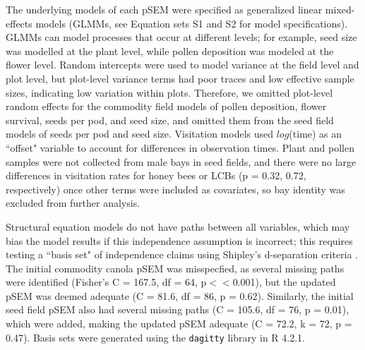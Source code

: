 \documentclass[12pt]{article} %
\begin{document}
The underlying models of each pSEM were specified as generalized linear mixed-effects models (GLMMs, see Equation sets S1 and S2 for model specifications).
GLMMs can model processes that occur at different levels; for example, seed size was modelled at the plant level, while pollen deposition was modeled at the flower level.
Random intercepts were used to model variance at the field level and plot level, but plot-level variance terms had poor traces and low effective sample sizes, indicating low variation within plots.
Therefore, we omitted plot-level random effects for the commodity field models of pollen deposition, flower survival, seeds per pod, and seed size, and omitted them from the seed field models of seeds per pod and seed size.
Visitation models used $log$(time) as an ``offset" variable to account for differences in observation times.
Plant and pollen samples were not collected from male bays in seed fields, and there were no large differences in visitation rates for honey bees or LCBs (p = 0.32, 0.72, respectively) once other terms were included as covariates, so bay identity was excluded from further analysis.

Structural equation models do not have paths between all variables, which may bias the model results if this independence assumption is incorrect; this requires testing a ``basis set" of independence claims using Shipley's d-separation criteria \citep{shipley2000, shipley2009}.
The initial commodity canola pSEM was misspecfied, as several missing paths were identified (Fisher's C = 167.5, df = 64, p$<<$0.001), but the updated pSEM was deemed adequate (C = 81.6, df = 86, p = 0.62).
Similarly, the initial seed field pSEM also had several missing paths (C = 105.6, df = 76, p = 0.01), which were added, making the updated pSEM adequate (C = 72.2, k = 72, p = 0.47).
Basis sets were generated using the \texttt{dagitty} library in R 4.2.1.
\end{document}

